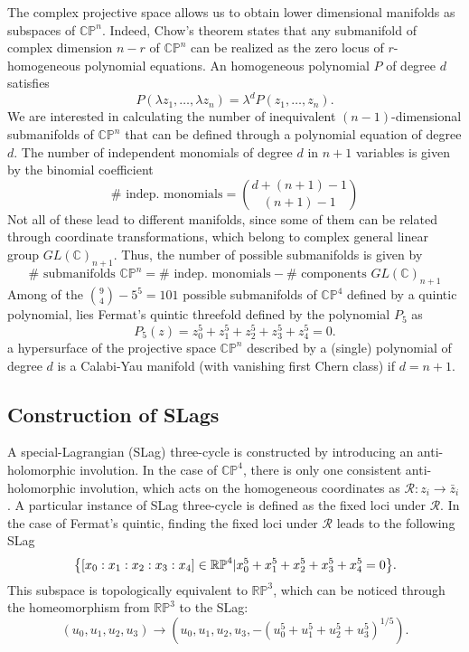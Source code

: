 The complex projective space allows us to obtain lower dimensional manifolds as subspaces of $\mathbb{CP}^n$.
Indeed, Chow's theorem states that any submanifold of complex dimension $n-r$ of $\mathbb{CP}^n$ can be realized as the zero locus of $r$-homogeneous polynomial equations.
An homogeneous polynomial $P$ of degree $d$ satisfies
\begin{equation}
  P(\lambda z_1,\ldots,\lambda z_n)=\lambda^d P(z_1,\ldots,z_n).
\end{equation}
We are interested in calculating the number of inequivalent $(n-1)$-dimensional submanifolds of $\mathbb{CP}^n$ that can be defined
through a polynomial equation of degree $d$.
The number of independent monomials of degree $d$ in $n+1$ variables is given by the binomial coefficient
\begin{equation}
  \# \text{ indep. monomials}={{d+(n+1)-1}\choose{(n+1)-1}}
\end{equation}
Not all of these lead to different manifolds, since some of them can be related through coordinate transformations, 
which belong to complex general linear group $GL(\mathbb C)_{n+1}$.
Thus, the number of possible submanifolds is given by
\begin{equation}
  \# \text{ submanifolds } \mathbb{CP}^n = \# \text{ indep. monomials}-\# \text{ components }GL(\mathbb C)_{n+1}
\end{equation}
Among of the ${{9}\choose{4}}-5^5=101$ possible submanifolds of $\mathbb{CP}^4$ defined by a quintic polynomial, lies
Fermat's quintic threefold defined by the polynomial $P_5$ as
\begin{equation}
  P_5(z) = z_0^5+z_1^5+z_2^5+z_3^5+z_4^5=0.
\end{equation}
a hypersurface of the projective space $\mathbb{CP}^n$ described by a (single) polynomial of degree $d$ 
is a Calabi-Yau manifold (with vanishing first Chern class) if $d = n+1$. 

\subsection{Construction of SLags}
A special-Lagrangian (SLag) three-cycle is constructed by introducing an anti-holomorphic involution.
In the case of $\mathbb{CP}^4$, there is only one consistent anti-holomorphic involution,
which acts on the homogeneous coordinates as $\mathcal R: z_i \to\bar z_i$.
A particular instance of SLag three-cycle is defined as the fixed loci under $\mathcal R$.
In the case of Fermat's quintic, finding the fixed loci under $\mathcal R$ leads to the following SLag
\begin{equation}
  \qty{\qty[x_0:x_1:x_2:x_3:x_4]\in  \mathbb{RP}^4| x_0^5+x_1^5+x_2^5+x_3^5+x_4^5=0}.
\end{equation}
This subspace is topologically equivalent to $\mathbb{RP}^3$, which can be noticed through the
homeomorphism from $\mathbb{RP}^3$ to the SLag:
\begin{equation}
(u_0,u_1,u_2,u_3) \to (u_0,u_1,u_2,u_3, -(u_0^5+u_1^5+u_2^5+u_3^5)^{1/5}).
\end{equation}

